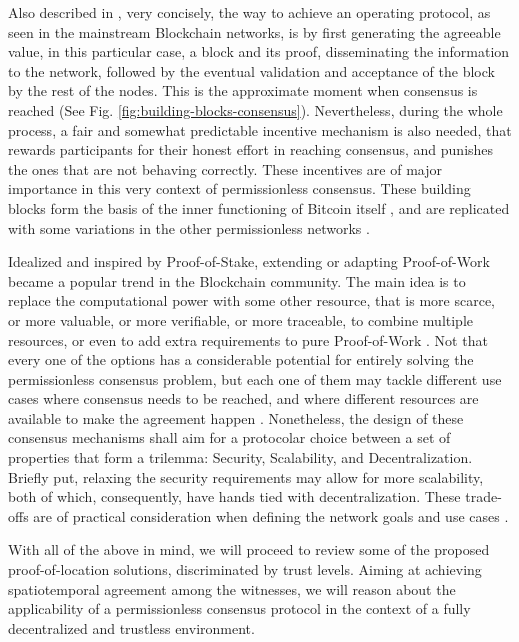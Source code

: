 Also described in \cite{survey-dist-consensus}, very concisely, the way to achieve an operating protocol, as seen in the mainstream Blockchain networks, is by first generating the agreeable value, in this particular case, a block and its proof, disseminating the information to the network, followed by the eventual validation and acceptance of the block by the rest of the nodes. This is the approximate moment when consensus is reached (See Fig. \ref{fig:building-blocks-consensus}). Nevertheless, during the whole process, a fair and somewhat predictable incentive mechanism is also needed, that rewards participants for their honest effort in reaching consensus, and punishes the ones that are not behaving correctly. These incentives are of major importance in this very context of permissionless consensus. These building blocks form the basis of the inner functioning of Bitcoin itself \cite{nakamoto2008bitcoin}, and are replicated with some variations in the other permissionless networks \cite{buterin2014next}.

Idealized and inspired by Proof-of-Stake, extending or adapting Proof-of-Work became a popular trend in the Blockchain community. The main idea is to replace the computational power with some other resource, that is more scarce, or more valuable, or more verifiable, or more traceable, to combine multiple resources, or even to add extra requirements to pure Proof-of-Work \cite{survey-dist-consensus}. Not that every one of the options has a considerable potential for entirely solving the permissionless consensus problem, but each one of them may tackle different use cases where consensus needs to be reached, and where different resources are available to make the agreement happen \cite{BOURAGA2021114384, 9376868}. Nonetheless, the design of these consensus mechanisms shall aim for a protocolar choice between a set of properties that form a trilemma: Security, Scalability, and Decentralization. Briefly put, relaxing the security requirements may allow for more scalability, both of which, consequently, have hands tied with decentralization. These trade-offs are of practical consideration when defining the network goals and use cases \cite{survey-dist-consensus}.

With all of the above in mind, we will proceed to review some of the proposed proof-of-location solutions, discriminated by trust levels. Aiming at achieving spatiotemporal agreement among the witnesses, we will reason about the applicability of a permissionless consensus protocol in the context of a fully decentralized and trustless environment.